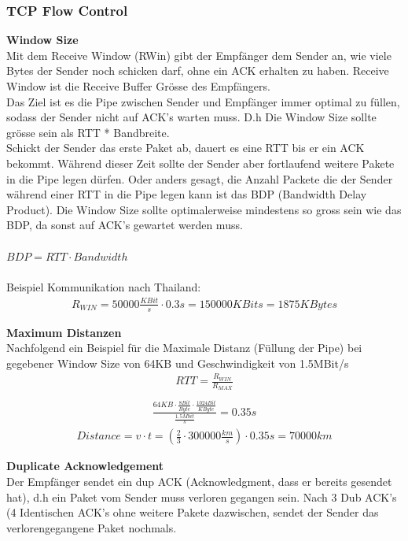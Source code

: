 \subsubsection{TCP Flow Control}
\textbf{Window Size}\\
Mit dem Receive Window (RWin) gibt der Empfänger dem Sender an, wie viele Bytes der Sender noch schicken darf, ohne ein ACK erhalten zu haben. Receive Window ist die Receive Buffer Grösse des Empfängers.\\
Das Ziel ist es die Pipe zwischen Sender und Empfänger immer optimal zu füllen, sodass der Sender nicht auf ACK's warten muss. D.h Die Window Size sollte grösse sein als RTT * Bandbreite.\\
Schickt der Sender das erste Paket ab, dauert es eine RTT bis er ein ACK bekommt. Während dieser Zeit sollte der Sender aber fortlaufend weitere Pakete in die Pipe legen dürfen. Oder anders gesagt, die Anzahl Packete die der Sender während einer RTT in die Pipe legen kann ist das BDP (Bandwidth Delay Product). Die Window Size sollte optimalerweise mindestens so gross sein wie das BDP, da sonst auf ACK's gewartet werden muss.\\\\
$BDP=RTT \cdot Bandwidth$\\\\
Beispiel Kommunikation nach Thailand:\\
\begin{align*}
R_{WIN} = 50000 \frac{KBit}{s} \cdot 0.3s = 150000 KBits = 1875 KBytes
\end{align*}

\textbf{Maximum Distanzen}\\
Nachfolgend ein Beispiel für die Maximale Distanz (Füllung der Pipe) bei gegebener Window Size von 64KB und Geschwindigkeit von 1.5MBit/s
\begin{align*}
RTT = \frac{R_{WIN}}{R_{MAX}}\\
\end{align*}
\begin{align*}
\frac{64KB \cdot \frac{8Bit}{Byte} \cdot \frac{1024Bit}{KByte}}{\frac{1.5Mbit}{s}} = 0.35s
\end{align*}
\begin{align*}
Distance = v \cdot t =(\frac{2}{3} \cdot 300000 \frac{km}{s})\cdot 0.35s = 70000km
\end{align*}

\textbf{Duplicate Acknowledgement}\\
Der Empfänger sendet ein dup ACK (Acknowledgment, dass er bereits gesendet hat), d.h ein Paket vom Sender muss verloren gegangen sein. Nach 3 Dub ACK's (4 Identischen ACK's ohne weitere Pakete dazwischen, sendet der Sender das verlorengegangene Paket nochmals.


